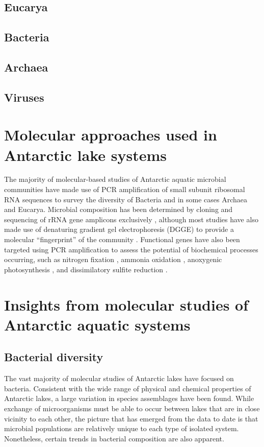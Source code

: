 \documentclass{book}
\begin{document}
\subsection{Eucarya}
\subsection{Bacteria}
\subsection{Archaea}
\subsection{Viruses}

\section{Molecular approaches used in Antarctic lake systems}

The majority of molecular-based studies of Antarctic aquatic microbial communities have made use of PCR amplification of small subunit ribosomal RNA sequences to survey the diversity of Bacteria
 and in some cases Archaea and Eucarya. %
Microbial composition has been determined by cloning and sequencing of rRNA gene amplicons exclusively 
\cite{Bowman2000a, Bowman2000, Gordon2000, Christner2001, Purdy2003, Karr2006, Matsuzaki2006, Kurosawa2010,Bielewicz2011}, 
although most studies have also made use of denaturing gradient gel electrophoresis (DGGE) to provide a molecular ``fingerprint'' of the community 
\cite{Pearce2003, Pearce2003, Karr2005, Pearce2005, Pearce2005, Unrein2005, Glatz2006, Mikucki2007, Mosier2007, Schiaffino2009, Villaescusa2010}.
Functional genes have also been targeted using PCR amplification to assess the potential of biochemical processes occurring, such as nitrogen fixation \cite{Olsen1998}, 
ammonia oxidation \cite{Voytek1999}, anoxygenic photosynthesis \cite{Karr2003}, and dissimilatory sulfite reduction \cite{Karr2005, Mikucki2009}. %

\section{Insights from molecular studies of Antarctic aquatic systems}

\subsection{Bacterial diversity}
The vast majority of molecular studies of Antarctic lakes have focused on bacteria.
Consistent with the wide range of physical and chemical properties of Antarctic lakes, a large variation in species assemblages have been found.
While exchange of microorganisms must be able to occur between lakes that are in close vicinity to each other, 
the picture that has emerged from the data to date is that microbial populations are relatively unique to each type of isolated system. 
Nonetheless, certain trends in bacterial composition are also apparent.
\end{document}
